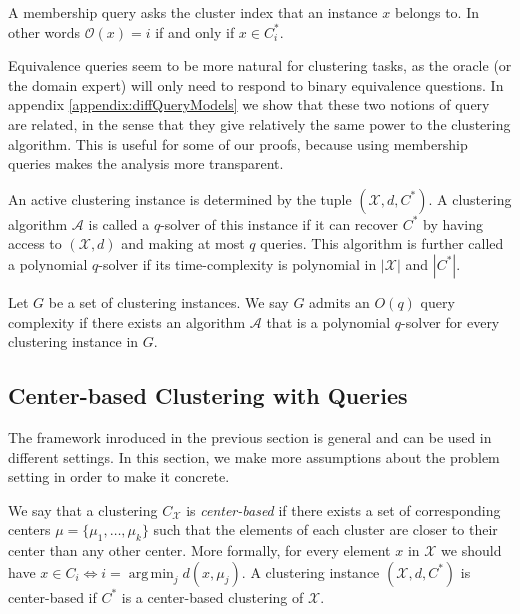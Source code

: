 \documentclass[orivec]{llncs}
\newcommand{\mc}{\mathcal}
\DeclareMathOperator*{\argmin}{arg\,min}
\begin{document}
\begin{definition}
A membership query asks the cluster index that an instance $x$ belongs to. In other words ${\mc O}(x) = i$ if and only if $x \in C^*_i$.
\end{definition}

Equivalence queries seem to be more natural for clustering tasks, as the oracle (or the domain expert) will only need to respond to binary equivalence questions. In appendix \ref{appendix:diffQueryModels} we show that these two notions of query are related, in the sense that they give relatively the same power to the clustering algorithm. This is useful for some of our proofs, because using membership queries makes the analysis more transparent.

An active clustering instance is determined by the tuple $(\mc X, d, C^*)$. A clustering algorithm $\mc A$ is called a $q$-solver of this instance if it can recover $C^*$ by having access to $(\mc X, d)$ and making at most $q$ queries. This algorithm is further called a polynomial $q$-solver if its time-complexity is polynomial in $|\mc X|$ and $|C^*|$.

\begin{definition}
\label{definition:QueryComplexity}
Let $G$ be a set of clustering instances. We say $G$ admits an $O(q)$ query complexity if there exists an algorithm $\mc A$ that is a polynomial $q$-solver for every clustering instance in $G$.
\end{definition}

\subsection{Center-based Clustering with Queries}

The framework inroduced in the previous section is general and can be used in different settings. In this section, we make more assumptions about the problem setting in order to make it concrete.

We say that a clustering $C_{\mc X}$ is \emph{center-based} if there exists a set of corresponding centers $\mc \mu = \{\mu_1, \ldots, \mu_k\}$ such that the elements of each cluster are closer to their center than any other center. More formally, for every element $x$ in $\mc X$ we should have $x\in C_i \Leftrightarrow i=\argmin_j d(x,\mu_j)$. A clustering instance $(\mc X, d, C^*)$ is center-based if $C^*$ is a center-based clustering of $\mc X$.
\end{document}
